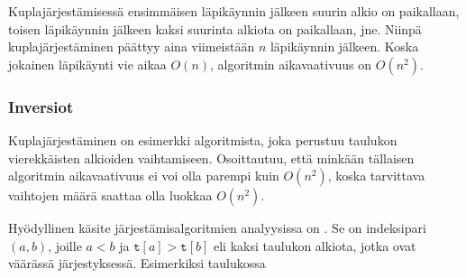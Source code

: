 \begin{center}
\end{center}


Kuplajärjestämisessä ensimmäisen läpikäynnin jälkeen suurin alkio
on paikallaan, toisen läpikäynnin jälkeen
kaksi suurinta alkiota on paikallaan, jne.
Niinpä kuplajärjestäminen päättyy aina viimeistään $n$
läpikäynnin jälkeen.
Koska jokainen läpikäynti vie aikaa $O(n)$,
algoritmin aikavaativuus on $O(n^2)$.

\subsubsection{Inversiot}


Kuplajärjestäminen on esimerkki algoritmista,
joka perustuu taulukon vierekkäisten alkioiden
vaihtamiseen.
Osoittautuu, että minkään tällaisen algoritmin
aikavaativuus ei voi olla parempi kuin $O(n^2)$,
koska tarvittava vaihtojen määrä
saattaa olla luokkaa $O(n^2)$.

Hyödyllinen käsite järjestämisalgoritmien
analyysissa on .
Se on indeksipari $(a,b)$, joille $a<b$
ja $\texttt{t}[a]>\texttt{t}[b]$
eli kaksi taulukon alkiota, jotka ovat väärässä
järjestyksessä.
Esimerkiksi taulukossa

\begin{center}
\end{center}

